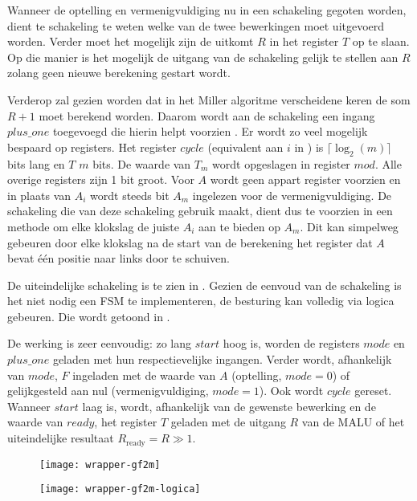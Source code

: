 Wanneer de optelling en vermenigvuldiging nu in een schakeling gegoten worden, dient te schakeling te weten welke van de twee bewerkingen moet uitgevoerd worden. Verder moet het mogelijk zijn de uitkomt $R$ in het register $T$ op te slaan. Op die manier is het mogelijk de uitgang van de schakeling gelijk te stellen aan $R$ zolang geen nieuwe berekening gestart wordt.  

Verderop zal gezien worden dat in het Miller algoritme verscheidene keren de som $R + 1$ moet berekend worden. Daarom wordt aan de schakeling een ingang $plus\_one$ toegevoegd die hierin helpt voorzien	. Er wordt zo veel mogelijk bespaard op registers. Het register $cycle$ (equivalent aan $i$ in ) is $\lceil \log _2 (m) \rceil$ bits lang en $T$ $m$ bits. De waarde van $T_m$ wordt opgeslagen in register $mod$.  Alle overige registers zijn 1 bit groot. Voor $A$ wordt geen appart register voorzien en in plaats van $A_i$ wordt steeds bit $A_m$ ingelezen voor de vermenigvuldiging. De schakeling die van deze schakeling gebruik maakt, dient dus te voorzien in een methode om elke klokslag de juiste $A_i$ aan te bieden op $A_m$. Dit kan simpelweg gebeuren door elke klokslag na de start van de berekening het register dat $A$ bevat \'e\'en positie naar links door te schuiven.

 De uiteindelijke schakeling is te zien in . Gezien de eenvoud van de schakeling is het niet nodig een FSM te implementeren, de besturing kan volledig via logica gebeuren. Die wordt getoond in .

De werking is zeer eenvoudig: zo lang $start$ hoog is, worden de registers $mode$ en $plus\_one$ geladen met hun respectievelijke ingangen. Verder wordt, afhankelijk van $mode$, $F$ ingeladen met de waarde van $A$ (optelling, $mode = 0$) of gelijkgesteld aan nul (vermenigvuldiging, $mode = 1$). Ook wordt $cycle$ gereset. Wanneer $start$ laag is, wordt, afhankelijk van de gewenste bewerking en de waarde van $ready$, het register $T$ geladen met de uitgang $R$ van de MALU of het uiteindelijke resultaat $R_{\text{ready}} = R \gg 1$.

\begin{figure}[h]
	\centering
		\texttt{[image: wrapper-gf2m]}
\end{figure}

\begin{figure}[h]
	\centering
		\texttt{[image: wrapper-gf2m-logica]}
\end{figure}

